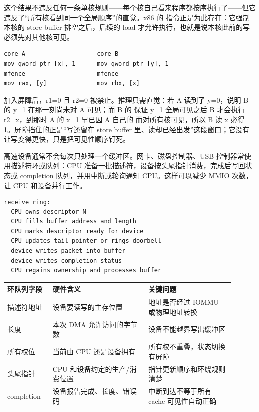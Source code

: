 这个结果不违反任何一条单核规则——每个核自己看来程序都按序执行了——但它违反了“所有核看到同一个全局顺序”的直觉。x86 的  指令正是为此存在：它强制本核的 store buffer 排空之后，后续的 load 才允许执行，也就是说本核此前的写必须先对其他核可见。

\begin{lstlisting}
core A                    core B
mov qword ptr [x], 1      mov qword ptr [y], 1
mfence                    mfence
mov rax, [y]              mov rbx, [x]
\end{lstlisting}

加入屏障后，r1=0 且 r2=0 被禁止。推理只需直觉：若 A 读到了 y=0，说明 B 的 y=1 在那一刻尚未对 A 可见；而 B 的  保证 y=1 全局可见之后 B 才会执行 r2=x，到那时 A 的 x=1 早已因 A 自己的  而对所有核可见，所以 B 读 x 必得 1。屏障挡住的正是“写还留在 store buffer 里、读却已经出发”这段窗口；它没有让写变得更快，只是把可见性顺序钉死。

高速设备通常不会每次只处理一个缓冲区。网卡、磁盘控制器、USB 控制器常使用描述符环或队列：CPU 准备一批描述符，设备按头尾指针消费，完成后写回状态或 completion 队列，并用中断或轮询通知 CPU。这样可以减少 MMIO 次数，让 CPU 和设备并行工作。

\begin{lstlisting}
receive ring:
  CPU owns descriptor N
  CPU fills buffer address and length
  CPU marks descriptor ready for device
  CPU updates tail pointer or rings doorbell
  device writes packet into buffer
  device writes completion status
  CPU regains ownership and processes buffer
\end{lstlisting}

\begin{longtable}{L{0.18\linewidth}L{0.38\linewidth}L{0.34\linewidth}}
\toprule
环队列字段 & 硬件含义 & 关键问题 \\
\midrule
描述符地址 & 设备要读写的主存位置 & 地址是否经过 IOMMU 或物理地址转换 \\
长度 & 本次 DMA 允许访问的字节数 & 设备不能越界写出缓冲区 \\
所有权位 & 当前由 CPU 还是设备拥有 & 所有权不重叠，状态切换有屏障 \\
头尾指针 & CPU 和设备约定的生产/消费位置 & 指针更新顺序和环绕规则清楚 \\
completion & 设备报告完成、长度、错误码 & 中断到达不等于所有 cache 可见性自动正确 \\
\bottomrule
\end{longtable}

